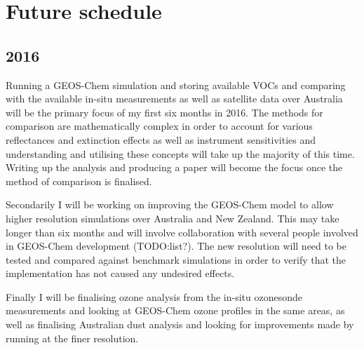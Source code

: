 \section{Future schedule}

\subsection{2016}

Running a GEOS-Chem simulation and storing available VOCs and comparing with the available in-situ measurements as well as satellite data over Australia will be the primary focus of my first six months in 2016.
The methods for comparison are mathematically complex in order to account for various reflectances and extinction effects as well as instrument sensitivities and understanding and utilising these concepts will take up the majority of this time.
Writing up the analysis and producing a paper will become the focus once the method of comparison is finalised.

Secondarily I will be working on improving the GEOS-Chem model to allow higher resolution simulations over Australia and New Zealand.
This may take longer than six months and will involve collaboration with several people involved in GEOS-Chem development (TODO:list?).
The new resolution will need to be tested and compared against benchmark simulations in order to verify that the implementation has not caused any undesired effects.

Finally I will be finalising ozone analysis from the in-situ ozonesonde measurements and looking at GEOS-Chem ozone profiles in the same areas, as well as finalising Australian dust analysis and looking for improvements made by running at the finer resolution.


